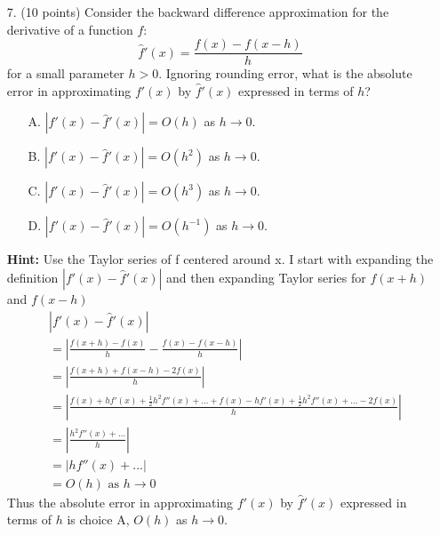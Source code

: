 \documentclass{article}
\begin{document}
\begin{enumerate}
    \newpage
    \item[7.] (10 points) Consider the backward difference approximation for the derivative of a function $f$:
    \[\hat{f}'(x)=\frac{f(x)-f(x-h)}{h}\]
    for a small parameter $h > 0$.\newline
    Ignoring rounding error, what is the absolute error in approximating $f'(x)$ by $\hat{f}'(x)$ expressed in terms of $h$?
    \begin{enumerate}
        \item[A.] $|f'(x) - \hat{f}'(x)| = O(h)$ as $h\to0$.
        \item[B.] $|f'(x) - \hat{f}'(x)| = O(h^2)$ as $h\to0$.
        \item[C.] $|f'(x) - \hat{f}'(x)| = O(h^3)$ as $h\to0$.
        \item[D.] $|f'(x) - \hat{f}'(x)| = O(h^{-1})$ as $h\to0$.
    \end{enumerate}
    \textbf{Hint:} Use the Taylor series of f centered around x.
    \newline
    \newline
    I start with expanding the definition $|f'(x) - \hat{f}'(x)|$ and then expanding Taylor series for $f(x+h)$ and $f(x-h)$
    \begin{align*}
        & |f'(x) - \hat{f}'(x)| \\
        &= \left|\frac{f(x+h)-f(x)}{h}-\frac{f(x)-f(x-h)}{h}\right| \\
        &= \left|\frac{f(x+h)+f(x-h)-2f(x)}{h}\right|\\
        &= \left|\frac{f(x) + hf'(x)+ \frac{1}{2}h^2f''(x)+...+f(x) - hf'(x)+ \frac{1}{2}h^2f''(x)+...-2f(x)}{h}\right|\\
        &= \left|\frac{h^2f''(x)+...}{h}\right|\\
        &= \left|hf''(x)+...\right|\\
        &= O(h) \text{   as   } h\to0
    \end{align*}
    Thus the absolute error in approximating $f'(x)$ by $\hat{f}'(x)$ expressed in terms of $h$ is choice A, $O(h)$ as $h\to0$.
    

\end{enumerate}
\end{document}
